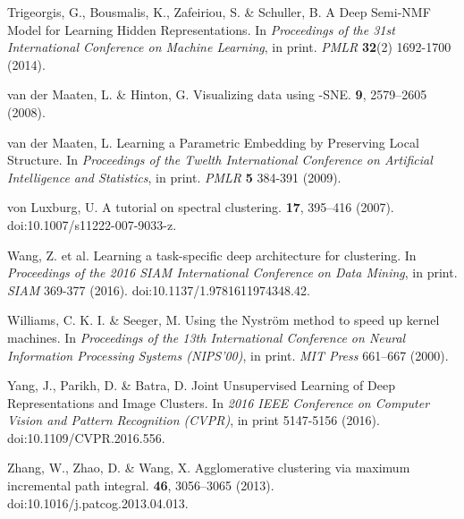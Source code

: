 \documentclass{article}
\begin{document}
\begin{thebibliography}{1}
Trigeorgis, G., Bousmalis, K., Zafeiriou, S. \& Schuller, B.
\newblock A Deep Semi-NMF Model for Learning Hidden Representations.
\newblock In {\em Proceedings of the 31st International Conference on Machine Learning}, in print. {\em PMLR} \textbf{32}(2) 1692-1700 (2014).

van der Maaten, L. \& Hinton, G.
\newblock Visualizing data using -SNE.
 \textbf{9}, 2579–2605 (2008).

van der Maaten, L.
\newblock Learning a Parametric Embedding by Preserving Local Structure.
\newblock In {\em Proceedings of the Twelth International Conference on Artificial Intelligence and Statistics}, in print. {\em PMLR} \textbf{5} 384-391 (2009).

von Luxburg, U. 
\newblock A tutorial on spectral clustering.
 \textbf{17}, 395–416 (2007). doi:10.1007/s11222-007-9033-z.

Wang, Z. et al.
\newblock Learning a task-specific deep architecture for clustering.
\newblock In {\em Proceedings of the 2016 SIAM International Conference on Data Mining}, in print. {\em SIAM} 369-377 (2016). doi:10.1137/1.9781611974348.42.

Williams, C. K. I. \& Seeger, M.
\newblock Using the Nyström method to speed up kernel machines.
\newblock In {\em Proceedings of the 13th International Conference on Neural Information Processing Systems (NIPS’00)}, in print. {\em MIT Press} 661–667 (2000).

Yang, J., Parikh, D. \& Batra, D.
\newblock Joint Unsupervised Learning of Deep Representations and Image Clusters.
\newblock In {\em 2016 IEEE Conference on Computer Vision and Pattern Recognition (CVPR)}, in print 5147-5156 (2016). doi:10.1109/CVPR.2016.556.

Zhang, W., Zhao, D. \& Wang, X. 
\newblock Agglomerative clustering via maximum incremental path integral.
 \textbf{46}, 3056–3065 (2013). doi:10.1016/j.patcog.2013.04.013.

\end{thebibliography}
\end{document}
